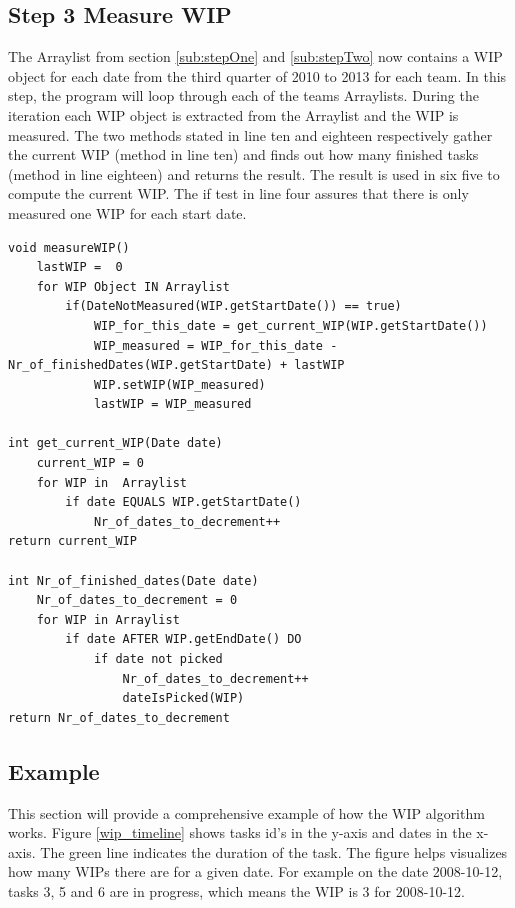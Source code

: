 \documentclass[UKenglish]{ifimaster}  %
\begin{document}
\subsection{Step 3 Measure WIP}
The Arraylist from section \ref{sub:stepOne}  and \ref{sub:stepTwo} now contains a WIP object for each date from the third quarter of 2010 to 2013 for each team. In this step, the program will loop through each of the teams Arraylists. During the iteration each WIP object is extracted from the Arraylist and the WIP is measured. The two methods stated in line ten and eighteen respectively gather the current WIP (method in line ten) and finds out how many finished tasks (method in line eighteen) and returns the result. The result is used in six five to compute the current WIP. The if test in line four assures that there is only measured one WIP for each start date.  
\begin{minipage}{\textwidth} 
\begin{lstlisting}[caption={WIP measurement},label={lst:measure}]
void measureWIP()
	lastWIP =  0
	for WIP Object IN Arraylist	
		if(DateNotMeasured(WIP.getStartDate()) == true)
			WIP_for_this_date = get_current_WIP(WIP.getStartDate())  
			WIP_measured = WIP_for_this_date - Nr_of_finishedDates(WIP.getStartDate) + lastWIP
			WIP.setWIP(WIP_measured)
			lastWIP = WIP_measured 

int get_current_WIP(Date date)
	current_WIP = 0
	for WIP in  Arraylist
		if date EQUALS WIP.getStartDate()
			Nr_of_dates_to_decrement++
return current_WIP
			 	
int Nr_of_finished_dates(Date date)
	Nr_of_dates_to_decrement = 0
	for WIP in Arraylist
		if date AFTER WIP.getEndDate() DO
			if date not picked
				Nr_of_dates_to_decrement++
				dateIsPicked(WIP)				
return Nr_of_dates_to_decrement 
 \end{lstlisting}
  \end{minipage}

\subsection{Example}
\label{sec:Example}
This section will provide a comprehensive example of how the WIP algorithm works.  
Figure \ref{wip_timeline}  shows tasks id's in the y-axis and dates in the x-axis. The green line indicates the duration of the task. The figure helps  visualizes how many WIPs there are for a given date. For example on the date 2008-10-12, tasks 3, 5 and 6 are in progress, which means the WIP is 3 for 2008-10-12.  
\end{document}
